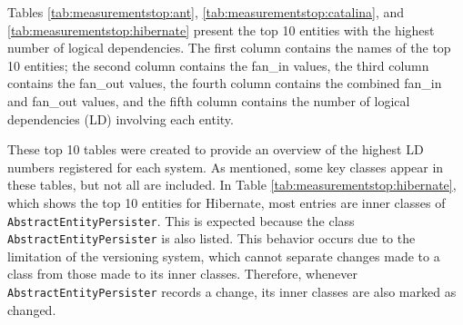 \begin{table}[!h]
\renewcommand{\arraystretch}{1}
\caption{Measurements for Hibernate key classes.}
\label{tab:measurementsfan:hibernate}
\centering
{}
\end{table}



Tables \ref{tab:measurementstop:ant}, \ref{tab:measurementstop:catalina}, and \ref{tab:measurementstop:hibernate} present the top 10 entities with the highest number of logical dependencies. The first column contains the names of the top 10 entities; the second column contains the fan\_in values, the third column contains the fan\_out values, the fourth column contains the combined fan\_in and fan\_out values, and the fifth column contains the number of logical dependencies (LD) involving each entity.

These top 10 tables were created to provide an overview of the highest LD numbers registered for each system. As mentioned, some key classes appear in these tables, but not all are included. In Table \ref{tab:measurementstop:hibernate}, which shows the top 10 entities for Hibernate, most entries are inner classes of \texttt{AbstractEntityPersister}. This is expected because the class \texttt{AbstractEntityPersister} is also listed. This behavior occurs due to the limitation of the versioning system, which cannot separate changes made to a class from those made to its inner classes. Therefore, whenever \texttt{AbstractEntityPersister} records a change, its inner classes are also marked as changed.

